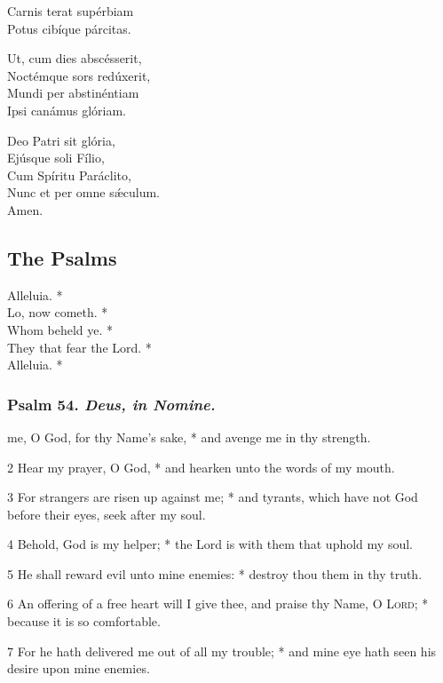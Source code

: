{Carnis terat supérbiam\\
Potus cibíque párcitas.\\
\par
Ut, cum dies abscésserit,\\
Noctémque sors redúxerit,\\
Mundi per abstinéntiam\\
Ipsi canámus glóriam.\\
\par
Deo Patri sit glória,\\
Ejúsque soli Fílio,\\
Cum Spíritu Paráclito,\\
Nunc et per omne sǽculum.\\
Amen.
}
\subsection{The Psalms}
 Alleluia. *\\
 Lo, now cometh. *\\
 Whom beheld ye. *\\
 They that fear the Lord. *\\
 Alleluia. *
\subsubsection{Psalm 54. \textit{Deus, in Nomine.}}
 me, O God, for thy Name's sake, * and avenge me in thy strength.\par
2 Hear my prayer, O God, * and hearken unto the words of my mouth.\par
3 For strangers are risen up against me; * and tyrants, which have not God before their eyes, seek after my soul.\par
4 Behold, God is my helper; * the Lord is with them that uphold my soul.\par
5 He shall reward evil unto mine enemies: * destroy thou them in thy truth.\par
6 An offering of a free heart will I give thee, and praise thy Name, O \textsc{Lord}; * because it is so comfortable.\par
7 For he hath delivered me out of all my trouble; * and mine eye hath seen his desire upon mine enemies.
